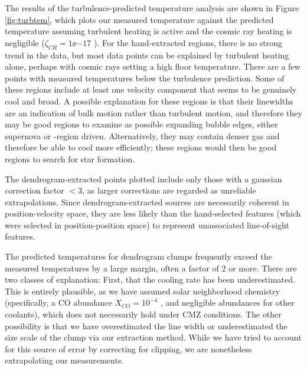 The results of the turbulence-predicted temperature analysis are shown in 
Figure \ref{fig:turbtem}, which plots our measured temperature against
the predicted temperature assuming turbulent heating is active and the
cosmic ray heating is negligible ($\zeta_{CR}=1\ee{-17}$ \pers).  For the
hand-extracted regions, there is no strong trend in the data, but most data
points can be explained by turbulent heating alone, perhaps with cosmic rays
setting a high floor temperature.  There are a few points with measured
temperatures below the turbulence prediction.  Some of these regions
include at least one velocity component that seems
to be genuinely cool and broad.  A possible explanation for these regions is
that their linewidths are an indication of bulk motion rather than turbulent
motion, and therefore they may be good regions to examine as possible expanding
bubble edges, either supernova or \hii-region driven.  Alternatively, they may
contain denser gas and therefore be able to cool more efficiently; these regions
would then be good regions to search for star formation.

The dendrogram-extracted points plotted include only those with a gaussian
correction factor $<3$, as larger corrections are regarded as unreliable
extrapolations.  Since dendrogram-extracted sources are necessarily coherent in
position-velocity space, they are less likely than the hand-selected features
(which were selected in position-position space) to represent unassociated
line-of-sight features.

The predicted temperatures for dendrogram clumps frequently exceed the measured
temperatures by a large margin, often a factor of 2 or more.  There are two
classes of explanation: First, that the cooling rate has been underestimated.
This is entirely plausible, as we have assumed solar neighborhood chemistry
(specifically, a CO abundance $X_{CO}=10^{-4}$ \hh, and negligible abundances
for other
coolants), which does not necessarily hold under CMZ conditions.  The other
possibility is that we have overestimated the line width or underestimated the
size scale of the clump via our extraction method.  While we have tried to
account for this source of error by correcting for clipping, we are nonetheless
extrapolating our measurements.

%

